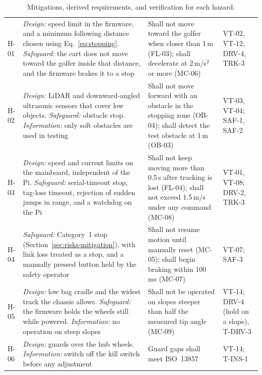 \begin{table}[!htbp]
\centering
\caption{Mitigations, derived requirements, and verification for each hazard.}
\label{tab:mitigations}
\footnotesize\renewcommand{\arraystretch}{1.0}
\begin{tabularx}{\linewidth}{@{}L{0.35in} Y Y L{0.85in}@{}}
 &  &  &  \\
\midrule
H-01 & \textit{Design:} speed limit in the firmware, and a minimum following distance chosen using Eq.~\eqref{eq:stopping}. \textit{Safeguard:} the cart does not move toward the golfer inside that distance, and the firmware brakes it to a stop & Shall not move toward the golfer when closer than 1\,m (FL-03); shall decelerate at 2\,m/s$^2$ or more (MC-06) & VT-02, VT-12; DRV-4, TRK-3 \\
\addlinespace[2pt]
H-02 & \textit{Design:} \acs{LiDAR} and downward-angled ultrasonic sensors that cover low objects. \textit{Safeguard:} obstacle stop. \textit{Information:} only soft obstacles are used in testing & Shall not move forward with an obstacle in the stopping zone (OB-04); shall detect the test obstacle at 1\,m (OB-03) & VT-03, VT-04; SAF-1, SAF-2 \\
\addlinespace[2pt]
H-03 & \textit{Design:} speed and current limits on the mainboard, independent of the Pi. \textit{Safeguard:} serial-timeout stop, tag-loss timeout, rejection of sudden jumps in range, and a watchdog on the Pi & Shall not keep moving more than 0.5\,s after tracking is lost (FL-04); shall not exceed 1.5\,m/s under any command (MC-08) & VT-01, VT-08; DRV-2, TRK-3 \\
\addlinespace[2pt]
H-04 & \textit{Safeguard:} Category~1 stop (Section~\ref{sec:risks-mitigation}), with link loss treated as a stop, and a manually pressed button held by the safety operator & Shall not resume motion until manually reset (MC-05); shall begin braking within 100\,ms (MC-07) & VT-07; SAF-3 \\
\addlinespace[2pt]
H-05 & \textit{Design:} low bag cradle and the widest track the chassis allows. \textit{Safeguard:} the firmware holds the wheels still while powered. \textit{Information:} no operation on steep slopes & Shall not be operated on slopes steeper than half the measured tip angle (MC-09) & VT-14; DRV-4 (hold on a slope), T-DRV-3 \\
\addlinespace[2pt]
H-06 & \textit{Design:} guards over the hub wheels. \textit{Information:} switch off the kill switch before any adjustment & Guard gaps shall meet ISO~13857 & VT-14; T-INS-1 \\

\end{tabularx}
\end{table}
